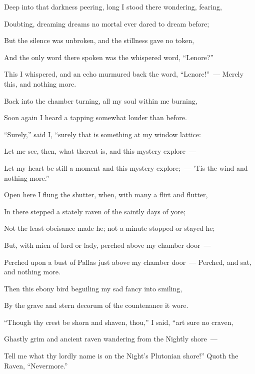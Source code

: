 \documentclass[openany]{book} %
\begin{document}
\bigskip
\par\noindent Deep into that darkness peering, long I stood there wondering, fearing,
\par\noindent Doubting, dreaming dreams no mortal ever dared to dream before;
\par\noindent But the silence was unbroken, and the stillness gave no token,
\par\noindent And the only word there spoken was the whispered word, “Lenore?”
\par\noindent This I whispered, and an echo murmured back the word, “Lenore!”~—
     Merely this, and nothing more.

\bigskip
\par\noindent Back into the chamber turning, all my soul within me burning,
\par\noindent Soon again I heard a tapping somewhat louder than before.
\par\noindent “Surely,” said I, “surely that is something at my window lattice:
\par\noindent Let me see, then, what thereat is, and this mystery explore~—
\par\noindent Let my heart be still a moment and this mystery explore;~—
     ’Tis the wind and nothing more.”

\bigskip
\par\noindent Open here I flung the shutter, when, with many a flirt and flutter,
\par\noindent In there stepped a stately raven of the saintly days of yore;
\par\noindent Not the least obeisance made he; not a minute stopped or stayed he;
\par\noindent But, with mien of lord or lady, perched above my chamber door~—
\par\noindent Perched upon a bust of Pallas just above my chamber door~—
     Perched, and sat, and nothing more.

\bigskip
\par\noindent Then this ebony bird beguiling my sad fancy into smiling,
\par\noindent By the grave and stern decorum of the countenance it wore.
\par\noindent “Though thy crest be shorn and shaven, thou,” I said, “art sure no craven,
\par\noindent Ghastly grim and ancient raven wandering from the Nightly shore~—
\par\noindent Tell me what thy lordly name is on the Night’s Plutonian shore!”
     Quoth the Raven, “Nevermore.”
\end{document}
